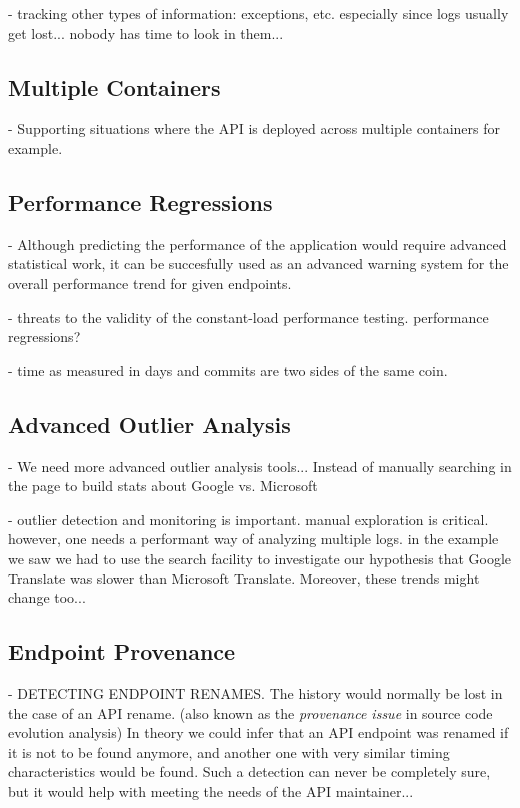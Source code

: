     - tracking other types of information: exceptions, etc. especially since logs usually get lost... nobody has time to look in them...


  \subsection*{Multiple Containers}

  -   Supporting situations where the API is deployed across multiple containers for example.


  \subsection*{Performance Regressions}

    - Although predicting the performance of the application would require advanced statistical work, it can be succesfully used as an advanced warning system for the overall performance trend for given endpoints.

    - threats to the validity of the constant-load performance testing. performance regressions? 


    - time as measured in days and commits are two sides of the same coin. 


  \subsection*{Advanced Outlier Analysis}

    - We need more advanced outlier analysis tools... Instead of manually searching in the page to build stats about Google vs. Microsoft

    - outlier detection and monitoring is important. manual exploration is critical. however, one needs a performant way of analyzing multiple logs. in the example we saw we had to use the search facility to investigate our hypothesis that Google Translate was slower than Microsoft Translate. Moreover, these trends might change too... 


  \subsection*{Endpoint Provenance }

    -   DETECTING ENDPOINT RENAMES.  The history would normally be lost in the case of an API rename. (also known as the {\em provenance issue} in source code evolution analysis)
    In theory we could infer that an API endpoint was renamed if it is not to be found anymore, and another one with very similar timing characteristics would be found. Such a detection can never be completely sure, but it would help with meeting the needs of the API maintainer... 







